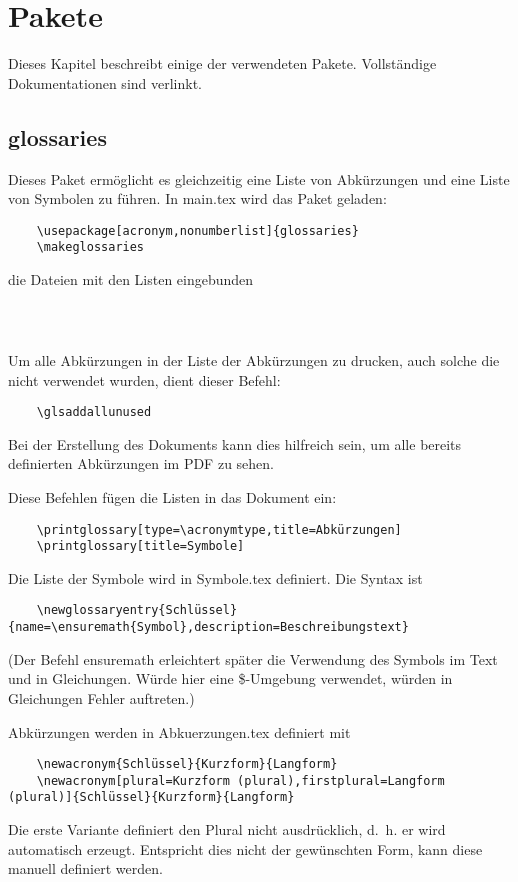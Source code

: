 \chapter{Pakete}\label{Kap:Pakete}
Dieses Kapitel beschreibt einige der verwendeten Pakete. Vollständige Dokumentationen sind verlinkt.

\section{glossaries}\label{Abs:glossaries}
Dieses Paket ermöglicht es gleichzeitig eine Liste von Abkürzungen und eine Liste von Symbolen zu führen. In \glqq{}main.tex\grqq{} wird das Paket geladen:
\begin{verbatim}
	\usepackage[acronym,nonumberlist]{glossaries}
	\makeglossaries
\end{verbatim}

die Dateien mit den Listen eingebunden
\begin{verbatim}
	
	
\end{verbatim}

Um alle Abkürzungen in der Liste der Abkürzungen zu drucken, auch solche die nicht verwendet wurden, dient dieser Befehl:
\begin{verbatim}
	\glsaddallunused
\end{verbatim}
Bei der Erstellung des Dokuments kann dies hilfreich sein, um alle bereits definierten Abkürzungen im \gls{PDF} zu sehen.

Diese Befehlen fügen die Listen in das Dokument ein:
\begin{verbatim}
	\printglossary[type=\acronymtype,title=Abkürzungen]
	\printglossary[title=Symbole]
\end{verbatim}

Die Liste der Symbole wird in \glqq{}Symbole.tex\grqq{} definiert. Die Syntax ist
\begin{verbatim}
	\newglossaryentry{Schlüssel}{name=\ensuremath{Symbol},description=Beschreibungstext}
\end{verbatim}
(Der Befehl ensuremath erleichtert später die Verwendung des Symbols im Text und in Gleichungen. Würde hier eine \$-Umgebung verwendet, würden in Gleichungen Fehler auftreten.)

Abkürzungen werden in \glqq{}Abkuerzungen.tex\grqq{} definiert mit
\begin{verbatim}
	\newacronym{Schlüssel}{Kurzform}{Langform}
	\newacronym[plural=Kurzform (plural),firstplural=Langform (plural)]{Schlüssel}{Kurzform}{Langform}
\end{verbatim}
Die erste Variante definiert den Plural nicht ausdrücklich, d.~h. er wird automatisch erzeugt. Entspricht dies nicht der gewünschten Form, kann diese manuell definiert werden.

